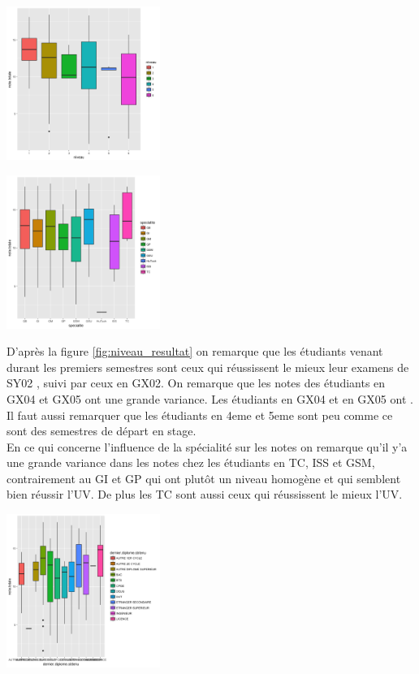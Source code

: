 \documentclass[10pt]{article}
\begin{document}
	
	\begin{minipage}{.5\textwidth}
		\includegraphics[width=50mm]{Figures/Notes/niveau_resultat.png}
		\label{fig:niveau_resultat}
	\end{minipage}%
	\hspace{0.08\linewidth}
	\begin{minipage}{.5\textwidth}
		\includegraphics[width=50mm]{Figures/Notes/specialite_resultat.png}
		\label{fig:specialite_resultat}
	\end{minipage}
	D'après la figure \ref{fig:niveau_resultat} on remarque que les étudiants venant durant les premiers semestres sont ceux qui réussissent le mieux leur examens de SY02 , suivi par ceux en GX02. On remarque que les notes des étudiants en GX04 et GX05 ont une grande variance. Les étudiants en GX04 et en GX05 ont . Il faut aussi remarquer que les étudiants en 4eme et 5eme sont peu comme ce sont des semestres de départ en stage. \\
	En ce qui concerne l'influence de la spécialité sur les notes on remarque qu'il y'a une grande variance dans les notes chez les étudiants en TC, ISS et GSM, contrairement au GI et GP qui ont plutôt un niveau homogène et qui semblent bien réussir l'UV. De plus les TC sont aussi ceux qui réussissent le mieux l'UV.
	\begin{center}
		\includegraphics[width=50mm]{Figures/Notes/diplome_resultat.png}
		\label{fig:formation_resultat}	
	\end{center}
	
\end{document}
